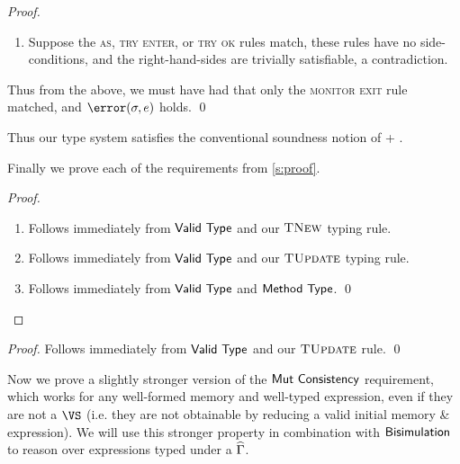 \begin{proof}
\begin{enumerate}
		\item Suppose the \textsc{as}, \textsc{try enter}, or \textsc{try ok} rules match, these rules have no side-conditions, and the right-hand-sides are trivially satisfiable, a contradiction.
	\end{enumerate}
	
	Thus from the above, we must have had that only the \textsc{monitor exit} rule matched, and $\error(\s, e)$ holds.
\qed\end{proof}

Thus our type system satisfies the conventional soundness notion of  + .

Finally we prove each of the requirements from \autoref{s:proof}.

\setcounter{requirement}{0}
\SS\REQTypeCons
\SS\begin{proof}
	\SS\begin{enumerate}
		\item Follows immediately from $\textsf{Valid Type}$ and our $\textsc{TNew}$
		typing rule.
		\item Follows immediately from $\textsf{Valid Type}$ and our $\textsc{TUpdate}$
		typing rule.
		\item Follows immediately from $\textsf{Valid Type}$ and $\textsf{Method Type}$.
	\qed\end{enumerate}
\end{proof}

\setcounter{requirement}{4}
\SS\REQMutUpd
\SS\begin{proof}
	Follows immediately from $\textsf{Valid Type}$ and our $\textsc{TUpdate}$
	rule.
\qed\end{proof}

Now we prove a slightly stronger version of the $\textsf{Mut Consistency}$
requirement, which works for any well-formed memory and well-typed
expression, even if they are not a $\VS$ (i.e. they are not obtainable
by reducing a valid initial memory \& expression). We will use this
stronger property in combination with $\textsf{Bisimulation}$ to reason
over expressions typed under a $\widehat{\Gamma}$.

